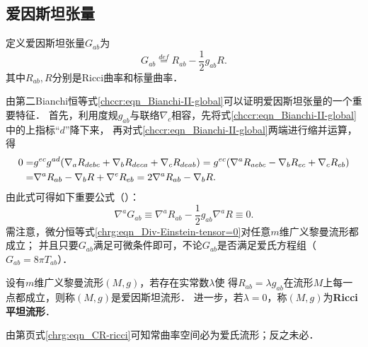 \subsection{爱因斯坦张量}
定义爱因斯坦张量$G_{ab}$为
\begin{equation}\label{chrg:eqn_Einstein-tensor}
    G_{ab} \overset{def}{=} R_{ab} -\frac{1}{2}g_{ab} R .
\end{equation}
其中$R_{ab},R$分别是Ricci曲率和标量曲率．

由第二Bianchi恒等式\eqref{chccr:eqn_Bianchi-II-global}可以证明爱因斯坦张量的一个重要特征．
首先，利用度规$g_{ab}$与联络$\nabla_c$相容，先将式\eqref{chccr:eqn_Bianchi-II-global}中的上指标“$d$”降下来，
再对式\eqref{chccr:eqn_Bianchi-II-global}两端进行缩并运算，得
\begin{align}
   0=&  g^{ec}g^{ad}(\nabla_a R_{debc} + \nabla_b R_{deca} + \nabla_c R_{deab} )
   = g^{ec}(\nabla^a R_{aebc} - \nabla_b R_{ec} + \nabla_c R_{eb} ) \notag \\
   =& \nabla^a R_{ab} - \nabla_b R + \nabla^e R_{eb}
   = 2\nabla^a R_{ab} - \nabla_b R . \label{chrg:eqn_Bianchi-contract}
\end{align}
由此式可得如下重要公式（）：
\begin{equation}\label{chrg:eqn_Div-Einstein-tensor=0}
    \nabla^a G_{ab} \equiv \nabla^a R_{ab} -\frac{1}{2}g_{ab} \nabla^a R \equiv 0 .
\end{equation}
需注意，微分恒等式\eqref{chrg:eqn_Div-Einstein-tensor=0}对任意$m$维广义黎曼流形都成立；
并且只要$G_{ab}$满足可微条件即可，不论$G_{ab}$是否满足爱氏方程组（$G_{ab}=8\pi T_{ab}$）．

\begin{definition}\label{chrg:def_Einstein-manifold}
    设有$m$维广义黎曼流形$(M,g)$，若存在实常数$\lambda$使
    得$R_{ab} = \lambda  g_{ab}$在流形$M$上每一点都成立，则称$(M,g)$是{\heiti 爱因斯坦流形}． 
    进一步，若$\lambda=0$，称$(M,g)$为{\bfseries\heiti Ricci平坦流形}．
\end{definition}
  

由第\pageref{chrg:eqn_CR-ricci}页式\eqref{chrg:eqn_CR-ricci}可知常曲率空间必为爱氏流形；反之未必．



